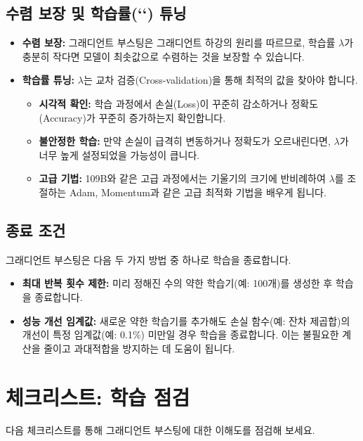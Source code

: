 \documentclass[11pt,a4paper]{article}
\begin{document}
\subsection{수렴 보장 및 학습률(`\lambda`) 튜닝}
\begin{itemize}
    \item \textbf{수렴 보장:} 그래디언트 부스팅은 그래디언트 하강의 원리를 따르므로, 학습률 $\lambda$가 충분히 작다면 모델이 최솟값으로 수렴하는 것을 보장할 수 있습니다.
    \item \textbf{학습률 튜닝:} $\lambda$는 교차 검증(Cross-validation)을 통해 최적의 값을 찾아야 합니다.
        \begin{itemize}
            \item \textbf{시각적 확인:} 학습 과정에서 손실(Loss)이 꾸준히 감소하거나 정확도(Accuracy)가 꾸준히 증가하는지 확인합니다.
            \item \textbf{불안정한 학습:} 만약 손실이 급격히 변동하거나 정확도가 오르내린다면, $\lambda$가 너무 높게 설정되었을 가능성이 큽니다.
            \item \textbf{고급 기법:} 109B와 같은 고급 과정에서는 기울기의 크기에 반비례하여 $\lambda$를 조절하는 Adam, Momentum과 같은 고급 최적화 기법을 배우게 됩니다.
        \end{itemize}
\end{itemize}

\subsection{종료 조건}
그래디언트 부스팅은 다음 두 가지 방법 중 하나로 학습을 종료합니다.
\begin{itemize}
    \item \textbf{최대 반복 횟수 제한:} 미리 정해진 수의 약한 학습기(예: 100개)를 생성한 후 학습을 종료합니다.
    \item \textbf{성능 개선 임계값:} 새로운 약한 학습기를 추가해도 손실 함수(예: 잔차 제곱합)의 개선이 특정 임계값(예: 0.1\%) 미만일 경우 학습을 종료합니다. 이는 불필요한 계산을 줄이고 과대적합을 방지하는 데 도움이 됩니다.
\end{itemize}

\newpage
\section{체크리스트: 학습 점검}
다음 체크리스트를 통해 그래디언트 부스팅에 대한 이해도를 점검해 보세요.
\end{document}

